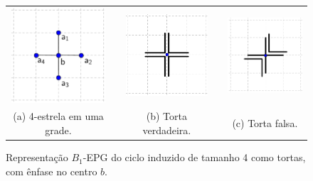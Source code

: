 \begin{figure}[htb]
  \centering
  \begin{tabular}{c c c c c }
    \includegraphics[width=3.5cm]{img/disposicaoTortaGrid3.pdf}    
    & &\includegraphics[width=3.5cm]{img/truePieGrid} 
    & &
 \includegraphics[width=3.5cm]{img/falsePieGrid} \\%
    {\footnotesize (a) 4-estrela em uma grade.}  & &  {\footnotesize (b) Torta verdadeira.} & & {\footnotesize (c) Torta falsa.} 
  \end{tabular}
  \caption{Representação $B_{1}$-EPG do ciclo induzido de tamanho  4 como tortas, com ênfase no centro $b$.}\label{fig:piesInGrid}
\end{figure} 